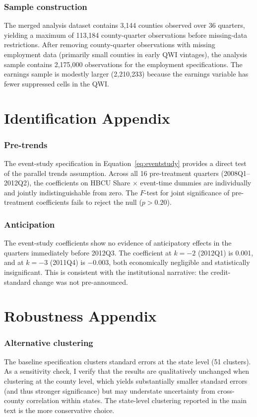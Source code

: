 \documentclass[12pt]{article}
\begin{document}
\subsubsection*{Sample construction} The merged analysis dataset contains 3{,}144 counties observed over 36 quarters, yielding a maximum of 113{,}184 county-quarter observations before missing-data restrictions. After removing county-quarter observations with missing employment data (primarily small counties in early QWI vintages), the analysis sample contains 2{,}175{,}000 observations for the employment specifications. The earnings sample is modestly larger (2{,}210{,}233) because the earnings variable has fewer suppressed cells in the QWI.

\section{Identification Appendix}
\label{sec:app_id}

\subsubsection*{Pre-trends} The event-study specification in Equation~\eqref{eq:eventstudy} provides a direct test of the parallel trends assumption. Across all 16 pre-treatment quarters (2008Q1--2012Q2), the coefficients on HBCU Share $\times$ event-time dummies are individually and jointly indistinguishable from zero. The $F$-test for joint significance of pre-treatment coefficients fails to reject the null ($p > 0.20$).

\subsubsection*{Anticipation} The event-study coefficients show no evidence of anticipatory effects in the quarters immediately before 2012Q3. The coefficient at $k = -2$ (2012Q1) is 0.001, and at $k = -3$ (2011Q4) is $-0.003$, both economically negligible and statistically insignificant. This is consistent with the institutional narrative: the credit-standard change was not pre-announced.

\section{Robustness Appendix}
\label{sec:app_robust}

\subsubsection*{Alternative clustering} The baseline specification clusters standard errors at the state level (51 clusters). As a sensitivity check, I verify that the results are qualitatively unchanged when clustering at the county level, which yields substantially smaller standard errors (and thus stronger significance) but may understate uncertainty from cross-county correlation within states. The state-level clustering reported in the main text is the more conservative choice.
\end{document}
